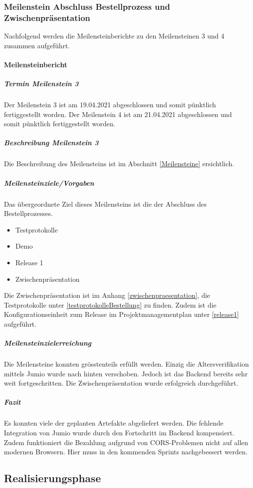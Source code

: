 \subsubsection{Meilenstein Abschluss Bestellprozess und Zwischenpräsentation}
Nachfolgend werden die Meilensteinberichte zu den Meilensteinen 3 und 4 zusammen aufgeführt. 
 \paragraph{Meilensteinbericht}
 \subparagraph{Termin Meilenstein 3}
 Der Meilenstein 3 ist am 19.04.2021 abgeschlossen und somit pünktlich fertiggestellt worden.
 Der Meilenstein 4 ist am 21.04.2021 abgeschlossen und somit pünktlich fertiggestellt worden. 
 \subparagraph{Beschreibung Meilenstein 3}
 Die Beschreibung des Meilensteins ist im Abschnitt \ref{Meilensteine} ersichtlich. 
 \subparagraph{Meilensteinziele/Vorgaben}
Das übergeordnete Ziel dieses Meilensteins ist die der Abschluss des Bestellprozesses. 
 \begin{itemize}
 	\item Testprotokolle
 	\item Demo
 	\item Release 1
 	\item Zwischenpräsentation
 \end{itemize}
Die Zwischenpräsentation ist im Anhang \ref{zwischenpraesentation}, die Testprotokolle unter \ref{testprotokolleBestellung} zu finden. Zudem ist die Konfigurationseinheit zum Release im Projektmanagementplan unter \ref{release1} aufgeführt. 
 \subparagraph{Meilensteinzielerreichung}
Die Meilensteine konnten grösstenteils erfüllt werden. Einzig die Altersverifikation mittels Jumio wurde nach hinten verschoben. Jedoch ist das Backend bereits sehr weit fortgeschritten.  
Die Zwischenpräsentation wurde erfolgreich durchgeführt. 
 \subparagraph{Fazit}
Es konnten viele der geplanten Artefakte abgeliefert werden. Die fehlende Integration von Jumio wurde durch den Fortschritt im Backend kompensiert. Zudem funktioniert die Bezahlung aufgrund von CORS-Problemen nicht auf allen modernen Browsern. Hier muss in den kommenden Sprints nachgebessert werden. 

\subsection{Realisierungsphase}
